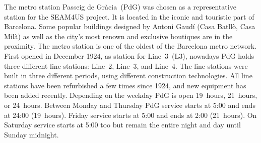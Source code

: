 
The metro station Passeig de Gr\`{a}cia~(PdG) was chosen as a representative station for the SEAM4US project. 
It is located in the iconic and touristic part of Barcelona. Some popular buildings designed by Antoni Gaud\'{i} (Casa Batll\`{o}, Casa Mil\`{a}) as well as the city's most renown and exclusive boutiques are in the proximity.
The metro station is one of the oldest of the Barcelona metro network. 
First opened in December 1924, as station for Line~3~(L3), nowadays PdG holds three different line stations: Line~2, Line~3, and Line~4. The line stations were built in three different periods, using different construction technologies. 
All line stations have been refurbished a few times since 1924, and new equipment has been added recently.
Depending on the weekday PdG is open 19~hours, 21~hours, or 24~hours. 
Between Monday and Thursday PdG service starts at 5:00 and ends at 24:00 (19~hours). Friday service starts at 5:00 and ends at 2:00 (21~hours). On Saturday service starts at 5:00 too but remain the entire night and day until Sunday midnight.

